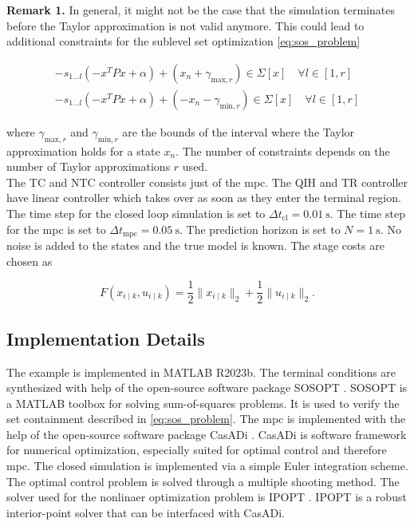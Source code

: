 \documentclass[10pt,a4paper,titlepage]{article}
\begin{document}
\textbf{Remark 1.} In general, it might not be the case that the simulation terminates before the Taylor approximation is not valid anymore.
This could lead to additional constraints for the sublevel set optimization \eqref{eq:sos_problem}

\begin{align}
	-s_{1 \dots l}(-x^TPx + \alpha) + (x_{n} + \gamma_{\text{max},r}) \in \Sigma[x] \quad \forall l \in [1,r] \\
	-s_{1 \dots l}(-x^TPx + \alpha) + (-x_{n} - \gamma_{\text{min},r}) \in \Sigma[x] \quad \forall l \in [1,r]
\end{align}

where $\gamma_{\text{max},r}$ and $\gamma_{\text{min},r}$ are the bounds of the interval where the Taylor approximation holds for a state $x_n$.
The number of constraints depends on the number of Taylor approximations $r$ used.\\

The TC and NTC controller consists just of the \gls{mpc}. The QIH and TR controller have linear controller which takes over as soon as they enter the terminal region.
The time step for the closed loop simulation is set to $\Delta t_{\text{cl}} = \SI{0.01}{\second}$.  The time step for the \gls{mpc} is set to
$\Delta t_{\text{mpc}} = \SI{0.05}{\second}$. The prediction horizon is set to $N = \SI{1}{\second}$. No noise is added to the states and the true
model is known. The stage costs are chosen as

\begin{equation}
	F\left(x_{i \mid k}, u_{i \mid k}\right) = \frac{1}{2} \lVert x_{i \mid k} \rVert_2 + \frac{1}{2} \lVert u_{i \mid k} \rVert_2.
\end{equation}

\subsection{Implementation Details}
The example is implemented in MATLAB R2023b.  The terminal conditions are synthesized with help of the open-source software package
SOSOPT \cite{seiler2013sosopt}. SOSOPT is a MATLAB toolbox for solving sum-of-squares problems. It is used to verify the set containment
described in \eqref{eq:sos_problem}. The \gls{mpc} is implemented with the help of the open-source software package CasADi \cite{Andersson2019}.
CasADi is software framework for numerical optimization, especially suited for optimal control and therefore \gls{mpc}. The closed simulation is implemented
via a simple Euler integration scheme. The optimal control problem is solved through a multiple shooting method. The solver used for the nonlinaer 
optimization problem is IPOPT \cite{Wächter2006}. IPOPT is a robust interior-point solver that can be interfaced with CasADi.\\
\end{document}
